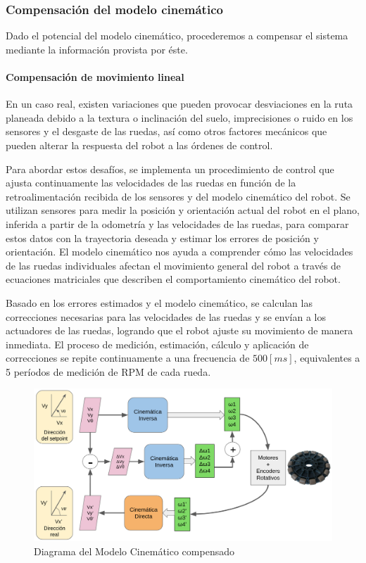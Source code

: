 \subsubsection{Compensación del modelo cinemático}

Dado el potencial del modelo cinemático, procederemos a compensar el sistema mediante la información provista por éste.

\paragraph{Compensación de movimiento lineal} \mbox{} \vspace{6pt}

En un caso real, existen variaciones que pueden provocar desviaciones en la ruta planeada debido a la textura o inclinación del suelo, imprecisiones o ruido en los sensores y el desgaste de las ruedas, así como otros factores mecánicos que pueden alterar la respuesta del robot a las órdenes de control.

Para abordar estos desafíos, se implementa un procedimiento de control que ajusta continuamente las velocidades de las ruedas en función de la retroalimentación recibida de los sensores y del modelo cinemático del robot. Se utilizan sensores para medir la posición y orientación actual del robot en el plano, inferida a partir de la odometría y las velocidades de las ruedas, para comparar estos datos con la trayectoria deseada y estimar los errores de posición y orientación. El modelo cinemático nos ayuda a  comprender cómo las velocidades de las ruedas individuales afectan el movimiento general del robot a través de ecuaciones matriciales que describen el comportamiento cinemático del robot.

Basado en los errores estimados y el modelo cinemático, se calculan las correcciones necesarias para las velocidades de las ruedas y se envían a los actuadores de las ruedas, logrando que el robot ajuste su movimiento de manera inmediata. \cite{rijalusalamkinematics} El proceso de medición, estimación, cálculo y aplicación de correcciones se repite continuamente a una frecuencia de $500[ms]$, equivalentes a 5 períodos de medición de RPM de cada rueda.

\begin{figure}[H]
    \centering
    \includegraphics[width=0.9\linewidth]{images/diag_compensacion_modelo_cinem.png}
    \caption{Diagrama del Modelo Cinemático compensado}
    \label{fig:diagramamodelocinemcompensado}
\end{figure}

